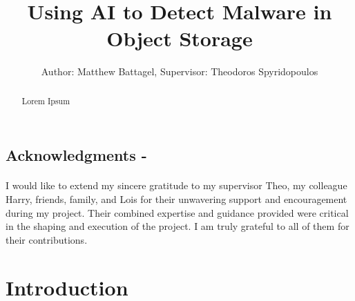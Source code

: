 \documentclass[12pt, conference, final, a4paper, onecolumn, compsoc]{IEEEtran}
\begin{document}
\title{Using AI to Detect Malware in Object Storage} \author{Author: Matthew
  Battagel, Supervisor: Theodoros Spyridopoulos} 
\maketitle{}

\subsection*{Acknowledgments - }
\paragraph{}
I would like to extend my sincere gratitude to my supervisor Theo, my colleague
Harry, friends, family, and Lois for their unwavering support and encouragement
during my project. Their combined expertise and guidance provided were critical
in the shaping and execution of the project. I am truly grateful to all of them
for their contributions.

\bigskip

\begin{abstract}
    Lorem Ipsum
\end{abstract}

\pagebreak






    \tableofcontents{}


    \section{Introduction}
\end{document}
